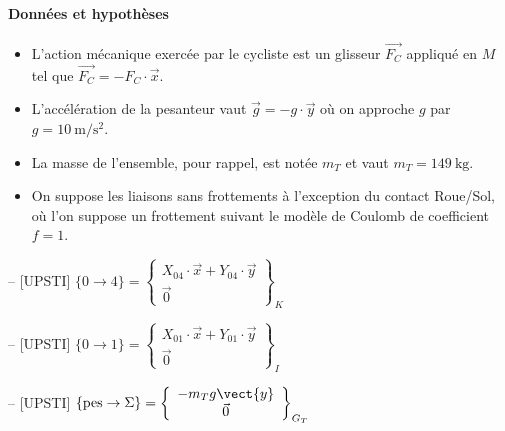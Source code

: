 \paragraph*{Données et hypothèses}
\begin{itemize}
  \item L'action mécanique exercée par le cycliste est un glisseur \(\overrightarrow{F_{C}}\) appliqué en \(M\) tel que \(\overrightarrow{F_{C}}=-F_{C} \cdot \vec{x}\).
  \item L'accélération de la pesanteur vaut \(\vec{g}=-g \cdot \vec{y}\) où on approche \(g\) par \(g=10 \mathrm{~m} / \mathrm{s}^{2}\).
  \item La masse de l'ensemble, pour rappel, est notée \(m_{T}\) et vaut \(m_{T}=149 \mathrm{~kg}\).
  \item On suppose les liaisons sans frottements à l'exception du contact Roue/Sol, où l'on suppose un frottement suivant le modèle de Coulomb de coefficient \(f=1\).
\end{itemize}
\fi

\ifprof
\begin{corrige}-- [UPSTI]
$\{0 \rightarrow 4\}=\left\{\begin{array}{c}
X_{04} \cdot \vec{x}+Y_{04} \cdot \vec{y} \\
\vec{0}
\end{array}\right\}_{K}
$
\end{corrige}
\else
\fi

\ifprof
\begin{corrige}-- [UPSTI]
$\{0 \rightarrow 1\}=\left\{\begin{array}{c}
X_{01} \cdot \vec{x}+Y_{01} \cdot \vec{y} \\
\vec{0}
\end{array}\right\}_{I}
$
\end{corrige}
\else
\fi

\ifprof
\begin{corrige}-- [UPSTI]
$\{\text{pes} \rightarrow \Sigma \}=\left\{\begin{array}{c}
-m_T g\vect{y}  \\
\vec{0}
\end{array}\right\}_{G_T}
$

\end{corrige}
\else
\fi

